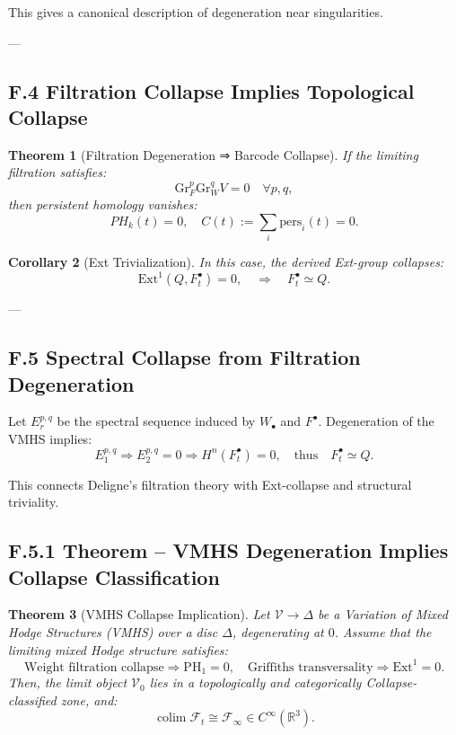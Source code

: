 \documentclass[11pt]{article}
\DeclareMathOperator{\colim}{colim}
\newtheorem{theorem}{Theorem}[section]
\newtheorem{corollary}[theorem]{Corollary}
\begin{document}
This gives a canonical description of degeneration near singularities.

---

\subsection*{F.4 Filtration Collapse Implies Topological Collapse}

\begin{theorem}[Filtration Degeneration ⇒ Barcode Collapse]
If the limiting filtration satisfies:
\[
\mathrm{Gr}_F^p \mathrm{Gr}_W^q V = 0 \quad \forall p,q,
\]
then persistent homology vanishes:
\[
PH_k(t) = 0, \quad C(t) := \sum_i \text{pers}_i(t) = 0.
\]
\end{theorem}

\begin{corollary}[Ext Trivialization]
In this case, the derived Ext-group collapses:
\[
\mathrm{Ext}^1(Q, F^\bullet_t) = 0,
\quad \Rightarrow \quad
F^\bullet_t \simeq Q.
\]
\end{corollary}

---

\subsection*{F.5 Spectral Collapse from Filtration Degeneration}

Let $E_r^{p,q}$ be the spectral sequence induced by $W_\bullet$ and $F^\bullet$.  
Degeneration of the VMHS implies:
\[
E_1^{p,q} \Rightarrow E_2^{p,q} = 0 \Rightarrow H^n(F^\bullet_t) = 0,
\quad \text{thus} \quad F^\bullet_t \simeq Q.
\]

This connects Deligne’s filtration theory with Ext-collapse and structural triviality.


\subsection*{F.5.1 Theorem – VMHS Degeneration Implies Collapse Classification}

\begin{theorem}[VMHS Collapse Implication]
Let \( \mathcal{V} \to \Delta \) be a Variation of Mixed Hodge Structures (VMHS) over a disc \( \Delta \), degenerating at \( 0 \).  
Assume that the limiting mixed Hodge structure satisfies:
\[
\text{Weight filtration collapse} \Rightarrow \mathrm{PH}_1 = 0,
\quad
\text{Griffiths transversality} \Rightarrow \mathrm{Ext}^1 = 0.
\]
Then, the limit object \( \mathcal{V}_0 \) lies in a topologically and categorically Collapse-classified zone, and:
\[
\colim \mathcal{F}_t \cong \mathcal{F}_\infty \in C^\infty(\mathbb{R}^3).
\]
\end{theorem}
\end{document}
